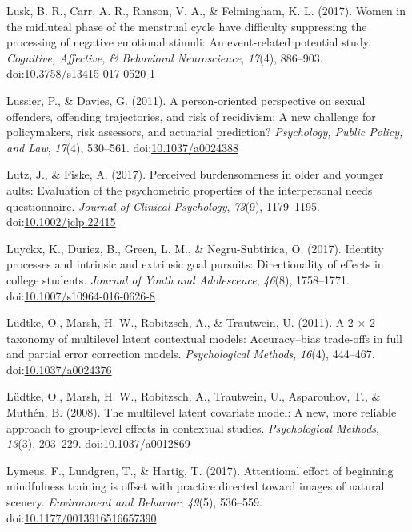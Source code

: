 \documentclass[english,man]{apa6}
\begin{document}
\hypertarget{ref-Lusk2017}{}
Lusk, B. R., Carr, A. R., Ranson, V. A., \& Felmingham, K. L. (2017).
Women in the midluteal phase of the menstrual cycle have difficulty
suppressing the processing of negative emotional stimuli: An
event-related potential study. \emph{Cognitive, Affective, \& Behavioral
Neuroscience}, \emph{17}(4), 886--903.
doi:\href{https://doi.org/10.3758/s13415-017-0520-1}{10.3758/s13415-017-0520-1}

\hypertarget{ref-Lussier2011}{}
Lussier, P., \& Davies, G. (2011). A person-oriented perspective on
sexual offenders, offending trajectories, and risk of recidivism: A new
challenge for policymakers, risk assessors, and actuarial prediction?
\emph{Psychology, Public Policy, and Law}, \emph{17}(4), 530--561.
doi:\href{https://doi.org/10.1037/a0024388}{10.1037/a0024388}

\hypertarget{ref-Lutz2017}{}
Lutz, J., \& Fiske, A. (2017). Perceived burdensomeness in older and
younger aults: Evaluation of the psychometric properties of the
interpersonal needs questionnaire. \emph{Journal of Clinical
Psychology}, \emph{73}(9), 1179--1195.
doi:\href{https://doi.org/10.1002/jclp.22415}{10.1002/jclp.22415}

\hypertarget{ref-Luyckx2017}{}
Luyckx, K., Duriez, B., Green, L. M., \& Negru-Subtirica, O. (2017).
Identity processes and intrinsic and extrinsic goal pursuits:
Directionality of effects in college students. \emph{Journal of Youth
and Adolescence}, \emph{46}(8), 1758--1771.
doi:\href{https://doi.org/10.1007/s10964-016-0626-8}{10.1007/s10964-016-0626-8}

\hypertarget{ref-Ludtke2011}{}
Lüdtke, O., Marsh, H. W., Robitzsch, A., \& Trautwein, U. (2011). A 2 ×
2 taxonomy of multilevel latent contextual models: Accuracy--bias
trade-offs in full and partial error correction models.
\emph{Psychological Methods}, \emph{16}(4), 444--467.
doi:\href{https://doi.org/10.1037/a0024376}{10.1037/a0024376}

\hypertarget{ref-Ludtke2008}{}
Lüdtke, O., Marsh, H. W., Robitzsch, A., Trautwein, U., Asparouhov, T.,
\& Muthén, B. (2008). The multilevel latent covariate model: A new, more
reliable approach to group-level effects in contextual studies.
\emph{Psychological Methods}, \emph{13}(3), 203--229.
doi:\href{https://doi.org/10.1037/a0012869}{10.1037/a0012869}

\hypertarget{ref-Lymeus2017}{}
Lymeus, F., Lundgren, T., \& Hartig, T. (2017). Attentional effort of
beginning mindfulness training is offset with practice directed toward
images of natural scenery. \emph{Environment and Behavior},
\emph{49}(5), 536--559.
doi:\href{https://doi.org/10.1177/0013916516657390}{10.1177/0013916516657390}
\end{document}
